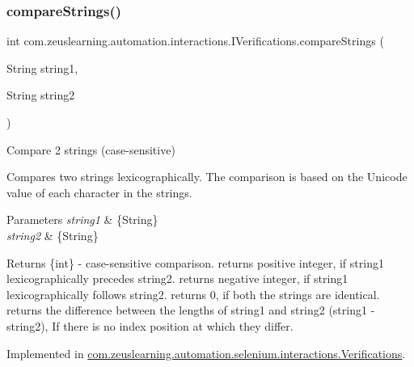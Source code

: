 \subsubsection{\texorpdfstring{compare\+Strings()}{compareStrings()}}
{\footnotesize\ttfamily int com.\+zeuslearning.\+automation.\+interactions.\+I\+Verifications.\+compare\+Strings (\begin{DoxyParamCaption}\item[{String}]{string1,  }\item[{String}]{string2 }\end{DoxyParamCaption})}

Compare 2 strings (case-\/sensitive)

Compares two strings lexicographically. The comparison is based on the Unicode value of each character in the strings. 


\begin{DoxyParams}{Parameters}
{\em string1} & \{String\} \\
\hline
{\em string2} & \{String\} \\
\hline
\end{DoxyParams}
\begin{DoxyReturn}{Returns}
\{int\} -\/ case-\/sensitive comparison. returns positive integer, if {\ttfamily string1} lexicographically precedes {\ttfamily string2}. returns negative integer, if {\ttfamily string1} lexicographically follows {\ttfamily string2}. returns 0, if both the strings are identical. returns the difference between the lengths of {\ttfamily string1} and {\ttfamily string2} ({\ttfamily string1} -\/ {\ttfamily string2}), If there is no index position at which they differ. 
\end{DoxyReturn}


Implemented in \hyperlink{classcom_1_1zeuslearning_1_1automation_1_1selenium_1_1interactions_1_1Verifications_a6b6a456d89f7b442a2e2acdcce2a62fa}{com.\+zeuslearning.\+automation.\+selenium.\+interactions.\+Verifications}.

\hypertarget{interfacecom_1_1zeuslearning_1_1automation_1_1interactions_1_1IVerifications_a8dbd85a25febbd6a7f5e3b1bf186e0f1}{}\label{interfacecom_1_1zeuslearning_1_1automation_1_1interactions_1_1IVerifications_a8dbd85a25febbd6a7f5e3b1bf186e0f1} 
